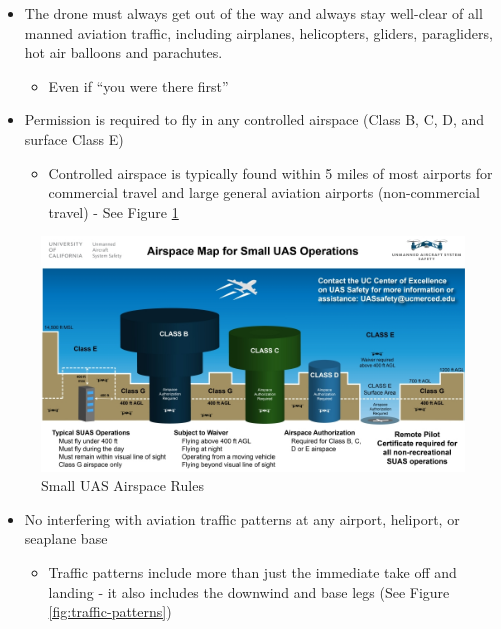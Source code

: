 \documentclass[
  12pt,
]{book}
\providecommand{\tightlist}{%
  \setlength{\itemsep}{0pt}\setlength{\parskip}{0pt}}
\begin{document}
\begin{itemize}
\tightlist
\item
  The drone must always get out of the way and always stay well-clear of all manned aviation traffic, including airplanes, helicopters, gliders, paragliders, hot air balloons and parachutes.

  \begin{itemize}
  \tightlist
  \item
    Even if ``you were there first''
  \end{itemize}
\item
  Permission is required to fly in any controlled airspace (Class B, C, D, and surface Class E)

  \begin{itemize}
  \tightlist
  \item
    Controlled airspace is typically found within 5 miles of most airports for commercial travel and large general aviation airports (non-commercial travel) - See Figure \ref{fig:SUAS-airspace-regs}
  \end{itemize}
\end{itemize}

\begin{figure}

{\centering \includegraphics[width=0.9\linewidth]{images/SUAS_airspace_map} 

}

\caption{Small UAS Airspace Rules}\label{fig:SUAS-airspace-regs}
\end{figure}

\begin{itemize}
\tightlist
\item
  No interfering with aviation traffic patterns at any airport, heliport, or seaplane base

  \begin{itemize}
  \tightlist
  \item
    Traffic patterns include more than just the immediate take off and landing - it also includes the downwind and base legs (See Figure \ref{fig:traffic-patterns})
  \end{itemize}
\end{itemize}
\end{document}

